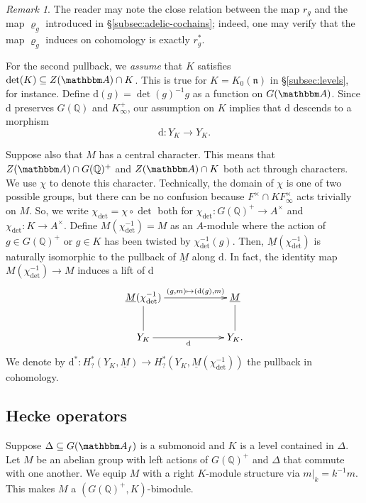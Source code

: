 \documentclass[10pt, twoside]{amsart}
\theoremstyle{plain}
\theoremstyle{definition}
\theoremstyle{remark}
\newtheorem{remark}[theorem]{Remark}
\numberwithin{equation}{subsection}
\def\Q{\mathbb Q}
\def\A{\mathbbm A}
\def\gn{\mathfrak n}
\def\rmd{\mathrm d}
\begin{document}
{
\begin{remark} The reader may note the close relation between the map $r_g$ and the map $\varrho_g$ introduced in \S \ref{subsec:adelic-cochains}; indeed, one may verify that the map $\varrho_g$ induces on cohomology is exactly $r_g^*$.
\end{remark}
}

For the second pullback, we {\em assume} that $K$ satisfies $\det(K) \subseteq Z(\A) \cap K$. This is true for $K=K_0(\gn)$ in \S \ref{subsec:levels}, for instance. Define $\rmd(g) = \det(g)^{-1}g$ as a function on $G(\A)$. Since $\rmd$ preserves $G(\Q)$ and $K_\infty^+$, our assumption on $K$ implies that $\rmd$ descends to a morphism
$$
\rmd : Y_K \longrightarrow Y_K.
$$

Suppose also that $M$ has a central character. This means that $Z(\A)\cap G(\Q)^+$ and $Z(\A) \cap K$ both act through characters. We use $\chi$ to denote this character. Technically, the domain of $\chi$ is one of two possible groups, but there can be no confusion because $F^\times \cap K F_\infty^\times$ acts trivially on $M$. So, we write $\chi_{\det} = \chi \circ \det$ both for $\chi_{\det} : G(\Q)^+ \rightarrow A^\times$ and $\chi_{\det} : K \rightarrow A^\times$. Define $M(\chi_{\det}^{-1}) = M$ as an $A$-module where the action of $g \in G(\Q)^+$ or $g \in K$ has been twisted by $\chi_{\det}^{-1}(g)$. Then, $\underline M(\chi_{\det}^{-1})$ is naturally isomorphic to the pullback of $\underline M$ along $\rmd$. In fact, the identity map $M(\chi_{\det}^{-1}) \rightarrow M$ induces a lift of $\rmd$ 
\begin{equation*}
\xymatrixcolsep{5pc}
\xymatrix{
\underline M(\chi_{\det}^{-1}) \ar@{-}[d] \ar[r]^-{(g,m) \mapsto (\rmd(g), m)} & \underline M \ar@{-}[d]\\
Y_{K} \ar[r]_-{\rmd} & Y_{K}.
}
\end{equation*}
We denote by $\rmd^{\ast} : H^{\ast}_{?}(Y_K,\underline M) \rightarrow H^{\ast}_{?}(Y_K,\underline M(\chi_{\det}^{-1}))$ the pullback in cohomology.

\subsection{Hecke operators}\label{subsec:hecke}

Suppose $\Delta \subseteq G(\A_f)$ is a submonoid and $K$ is a level contained in $\Delta$. Let $M$ be an abelian group with left actions of $G(\Q)^+$ and $\Delta$ that commute with one another. We equip $M$ with a right $K$-module structure via $m|_k = k^{-1}m$. This makes $M$ a $(G(\Q)^+,K)$-bimodule.
\end{document}

